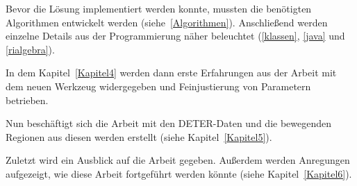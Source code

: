 Bevor die Lösung implementiert werden konnte, mussten die benötigten Algorithmen entwickelt werden (siehe~\vref{Algorithmen}). Anschließend werden einzelne Details aus der Programmierung näher beleuchtet (\vref{klassen}, \vref{java} und \vref{rialgebra}).

In dem Kapitel~\vref{Kapitel4} werden dann erste Erfahrungen aus der Arbeit mit dem neuen Werkzeug widergegeben und  Feinjustierung von Parametern betrieben.

Nun beschäftigt sich die Arbeit mit den DETER-Daten und die bewegenden Regionen aus diesen werden erstellt (siehe Kapitel~\vref{Kapitel5}).

Zuletzt wird ein Ausblick auf die Arbeit gegeben. Außerdem werden Anregungen aufgezeigt, wie diese Arbeit fortgeführt werden könnte (siehe Kapitel~\vref{Kapitel6}).
